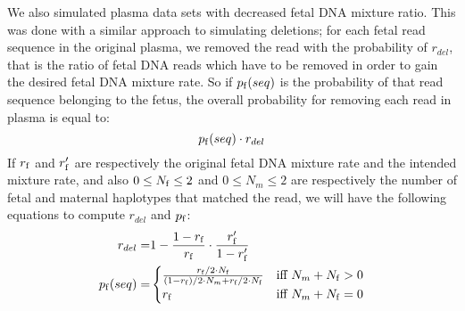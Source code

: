 	We also simulated plasma data sets with decreased fetal DNA mixture ratio. This was done with a similar approach to simulating deletions; for each fetal read sequence in the original plasma, we removed the read with the probability of $r_{del}$, that is the ratio of fetal DNA reads which have to be removed in order to gain the desired fetal DNA mixture rate. So if $p_{\mathrm{f}}(seq)$ is the probability of that read sequence belonging to the fetus, the overall probability for removing each read in plasma is equal to:
	 $$p_{\mathrm{f}}(seq) \cdot r_{del}$$
	 If $r_{\mathrm{f}}$ and $r'_{\mathrm{f}}$ are respectively the original fetal DNA mixture rate and the intended mixture rate, and also $0 \leq N_{\mathrm{f}} \leq 2$ and $0 \leq N_m \leq 2$ are respectively the number of fetal and maternal haplotypes that matched the read, we will have the following equations to compute $r_{del}$ and $p_{\mathrm{f}}$:
\begin{align*}
r_{del} =& 1 - \frac{1 - r_{\mathrm{f}} } { r_{\mathrm{f}}} \cdot \frac{r'_{\mathrm{f}}}{1-r'_{\mathrm{f}}}  \\
p_{\mathrm{f}}(seq) =& 
  \begin{cases}
    \frac{ r_{\mathrm{f}}/2 \cdot N_{\mathrm{f}} } { (1-r_{\mathrm{f}})/2 \cdot N_m + r_{\mathrm{f}}/2 \cdot N_{\mathrm{f}}} & \text{iff } N_m+N_{\mathrm{f}}>0 \\
    r_{\mathrm{f}} & \text{iff } N_m+N_{\mathrm{f}}=0
  \end{cases}
\end{align*}

